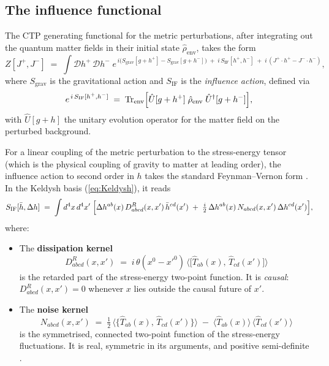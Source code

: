 \documentclass[12pt,a4paper]{article}
\begin{document}
\subsection{The influence functional}\label{sec:IF}

The CTP generating functional for the metric perturbations, after integrating out the quantum matter fields in their initial state $\hat{\rho}_{\mathrm{env}}$, takes the form \cite{HuVerdaguer2004,CalzettaHu1994,FeynmonVernon1963}
\begin{equation}\label{eq:ZCTP}
  Z[J^{+},J^{-}]
  \;=\; \int \mathcal{D}h^{+}\,\mathcal{D}h^{-}\;
  e^{\,i\bigl(S_{\mathrm{grav}}[g+h^{+}]-S_{\mathrm{grav}}[g+h^{-}]\bigr)
     \;+\; i\,S_{\mathrm{IF}}[h^{+},h^{-}]
     \;+\; i\,(J^{+}\cdot h^{+} - J^{-}\cdot h^{-})},
\end{equation}
where $S_{\mathrm{grav}}$ is the gravitational action and $S_{\mathrm{IF}}$ is the \emph{influence action}, defined via
\begin{equation}\label{eq:IFdef}
  e^{\,i\,S_{\mathrm{IF}}[h^{+},h^{-}]}
  \;=\;
  \mathrm{Tr}_{\mathrm{env}}\Bigl[
    \hat{U}[g+h^{+}]\;\hat{\rho}_{\mathrm{env}}\;\hat{U}^{\dagger}[g+h^{-}]
  \Bigr],
\end{equation}
with $\hat{U}[g+h]$ the unitary evolution operator for the matter field on the perturbed background.

For a linear coupling of the metric perturbation to the stress-energy tensor (which is the physical coupling of gravity to matter at leading order), the influence action to second order in $h$ takes the standard Feynman--Vernon form \cite{HuVerdaguer2008,HuVerdaguer2004}.
In the Keldysh basis (\ref{eq:Keldysh}), it reads
\begin{equation}\label{eq:SIF}
  S_{\mathrm{IF}}[\bar{h},\Delta h]
  \;=\;
  \int d^{4}x\,d^{4}x'\;
  \Bigl[
    \Delta h^{ab}(x)\,D^{R}_{abcd}(x,x')\,\bar{h}^{cd}(x')
    \;+\;
    \tfrac{i}{2}\,\Delta h^{ab}(x)\,N_{abcd}(x,x')\,\Delta h^{cd}(x')
  \Bigr],
\end{equation}
where:
\begin{itemize}
\item The \textbf{dissipation kernel}
\begin{equation}\label{eq:DRdef}
  D^{R}_{abcd}(x,x')
  \;=\;
  i\,\theta(x^{0}-x'^{0})\,
  \bigl\langle\bigl[\hat{T}_{ab}(x),\,\hat{T}_{cd}(x')\bigr]\bigr\rangle
\end{equation}
is the retarded part of the stress-energy two-point function.
It is \emph{causal}: $D^{R}_{abcd}(x,x')=0$ whenever $x$ lies outside the causal future of $x'$.

\item The \textbf{noise kernel}
\begin{equation}\label{eq:Ndef}
  N_{abcd}(x,x')
  \;=\;
  \tfrac{1}{2}\,\bigl\langle\bigl\{\hat{T}_{ab}(x),\,\hat{T}_{cd}(x')\bigr\}\bigr\rangle
  \;-\;
  \bigl\langle\hat{T}_{ab}(x)\bigr\rangle\,\bigl\langle\hat{T}_{cd}(x')\bigr\rangle
\end{equation}
is the symmetrised, connected two-point function of the stress-energy fluctuations.
It is real, symmetric in its arguments, and positive semi-definite \cite{HuVerdaguer2004}.
\end{itemize}
\end{document}
